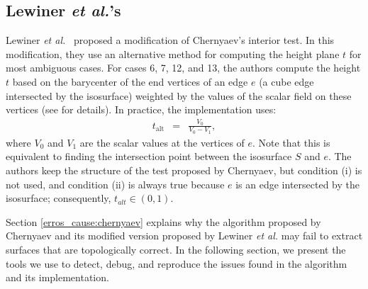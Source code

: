 \subsection{Lewiner \emph{et al.}'s \mc{}}

Lewiner \emph{et al.}~\cite{Lewiner:2003} proposed a modification of Chernyaev's interior test. In this modification, they use an alternative method for computing the height plane $t$ for most ambiguous cases. For cases  6, 7, 12, and 13, the authors compute the height $t$ based on the barycenter of the end vertices of an edge $e$ (a cube edge intersected by the isosurface) weighted by the values of the scalar field on these vertices (see \cite{Lewiner:2003} for details). In practice, the implementation uses:
\begin{eqnarray}
t_{\mathrm{alt}} &=& \frac{V_{0}}{V_{0} - V_{1}},\label{eq:alternative}
\end{eqnarray}
where $V_{0}$ and $V_{1}$ are the scalar values at the vertices of $e$. Note that this is equivalent to finding the intersection point between the isosurface $S$ and $e$. The authors keep the structure of the test proposed by Chernyaev, but condition (i) is not used, and condition (ii) is always true because $e$ is an edge intersected by the isosurface; consequently, $t_{alt} \in (0,1)$.

Section \ref{erros_cause:chernyaev} explains why the algorithm proposed by Chernyaev and its modified version proposed by Lewiner \emph{et al.} may fail to extract surfaces that are topologically correct. In the following section, we present the tools we use to detect, debug, and reproduce the issues found in the \mc{} algorithm and its implementation.

